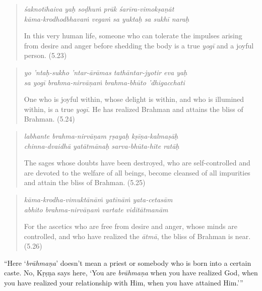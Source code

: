 \documentclass[12pt, twoside, openright]{memoir}
\begin{document}
\par
\begin{verse}
\textit{śaknotīhaiva yaḥ soḍhuṁ prāk śarīra-vimokṣaṇāt} \\
\textit{kāma-krodhodbhavaṁ vegaṁ sa yuktaḥ sa sukhī naraḥ}

\noindent In this very human life, someone who can tolerate the impulses arising from desire and anger before shedding the body is a true \textit{yogī} and a joyful person. (5.23)
\end{verse}
\par



\par
\begin{verse}
\textit{yo ’ntaḥ-sukho ’ntar-ārāmas tathāntar-jyotir eva yaḥ} \\
\textit{sa yogī brahma-nirvāṇaṁ brahma-bhūto ’dhigacchati}

\noindent One who is joyful within, whose delight is within, and who is illumined within, is a true \textit{yogī}. He has realized Brahman and attains the bliss of Brahman. (5.24)
\end{verse}
\par



\par
\begin{verse}
\textit{labhante brahma-nirvāṇam ṛṣayaḥ kṣīṇa-kalmaṣāḥ} \\
\textit{chinna-dvaidhā yatātmānaḥ sarva-bhūta-hite ratāḥ}

\noindent The sages whose doubts have been destroyed, who are self-controlled and are devoted to the welfare of all beings, become cleansed of all impurities and attain the bliss of Brahman. (5.25)
\end{verse}
\par



\par
\begin{verse}
\textit{kāma-krodha-vimuktānāṁ yatīnāṁ yata-cetasām} \\
\textit{abhito brahma-nirvāṇaṁ vartate viditātmanām}

\noindent For the ascetics who are free from desire and anger, whose minds are controlled, and who have realized the \textit{ātmā}, the bliss of Brahman is near. (5.26)
\end{verse}
\par


\enquote{Here \enquote{\textit{brāhmaṇa}} doesn’t mean a priest or somebody who is born into a certain caste. No, Kṛṣṇa says here, \enquote{You are \textit{brāhmaṇa} when you have realized God, when you have realized your relationship with Him, when you have attained Him.}}
\end{document}
